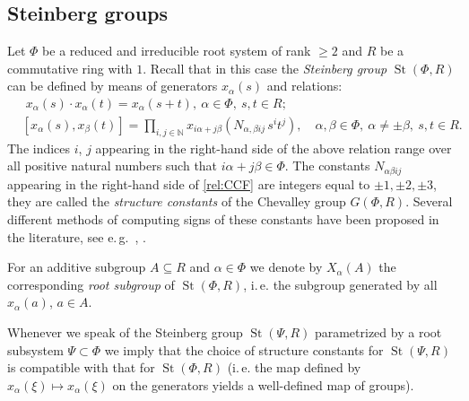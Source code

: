 \documentclass[oneside, 8pt]{amsart}
\theoremstyle{remark}
\theoremstyle{definition}
\numberwithin{lemma}{section}
\numberwithin{prop}{section}
\numberwithin{corollary}{section}
\numberwithin{externaltheorem}{section}
\DeclareMathOperator{\St}{St}
\numberwithin{equation}{section}
\begin{document}
\subsection{Steinberg groups} \label{sec:Steinberg-intro}
Let $\Phi$ be a reduced and irreducible root system of rank $\geq 2$ and $R$ be a commutative ring with $1$. Recall that in this case the \emph{Steinberg group} $\St(\Phi, R)$ can be defined by means of generators $x_{\alpha}(s)$ and relations:
\begin{align}
& \phantom{[}
x_\alpha(s) \cdot x_\alpha(t) = x_\alpha(s+t),\ \alpha\in\Phi,\ s,t\in R; \label{rel:add}\\
& [x_\alpha(s), x_\beta(t)] = \prod\limits_{i,j\in\mathbb{N}}
 x_{i\alpha + j\beta}\left(N_{\alpha,\beta ij}\, s^i t^j\right),\quad \alpha,\beta\in\Phi,\ \alpha\neq\pm\beta,\ s,t\in R. \label{rel:CCF}
\end{align}
The indices $i$, $j$ appearing in the right-hand side of the above relation range over
all positive natural numbers such that $i\alpha + j\beta\in\Phi$.
The constants $N_{\alpha \beta i j}$ appearing in the right-hand side of \eqref{rel:CCF} are integers equal to $\pm 1,\pm 2,\pm 3$, they are called the {\it structure constants} of the Chevalley group $G(\Phi, R)$. Several different methods of computing signs of these constants have been proposed in the literature, see e.\,g.~\cite{V00}, \cite[\S~9]{VP}. 

For an additive subgroup $A\subseteq R$ and $\alpha \in \Phi$ we denote by $X_\alpha(A)$ the corresponding {\it root subgroup} of $\St(\Phi, R)$, i.\,e. the subgroup generated by all $x_\alpha(a)$, $a \in A$.

Whenever we speak of the Steinberg group $\St(\Psi, R)$ parametrized by a root subsystem $\Psi \subset \Phi$ we imply that the choice of structure constants 
 for $\St(\Psi, R)$ is compatible with that for $\St(\Phi, R)$ (i.\,e. the map defined by $x_\alpha(\xi) \mapsto x_\alpha(\xi)$ on the generators yields a well-defined map of groups).
\end{document}

